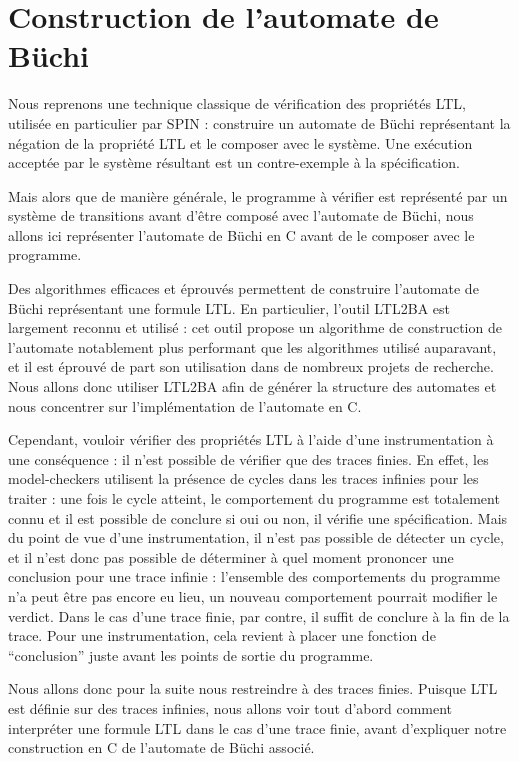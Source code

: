 \section{Construction de l'automate de Büchi}

Nous reprenons une technique classique de vérification des propriétés \ac{LTL},
utilisée en particulier par SPIN\cite{SPIN} : construire un automate de Büchi
représentant la négation de la propriété \ac{LTL} et le composer avec le
système. Une exécution acceptée par le système résultant est un contre-exemple à
la spécification.

Mais alors que de manière générale, le programme à vérifier est représenté par
un système de transitions avant d'être composé avec l'automate de Büchi, nous
allons ici représenter l'automate de Büchi en C avant de le composer avec le
programme.

Des algorithmes efficaces et éprouvés permettent de construire l'automate de
Büchi représentant une formule \ac{LTL}. En particulier, l'outil
LTL2BA\cite{ltl2ba} est largement reconnu et utilisé : cet outil propose un
algorithme de construction de l'automate notablement plus performant que les
algorithmes utilisé auparavant, et il est éprouvé de part son utilisation dans
de nombreux projets de recherche.
Nous allons donc utiliser LTL2BA afin de générer la structure des automates et
nous concentrer sur l'implémentation de l'automate en C.

Cependant, vouloir vérifier des propriétés \ac{LTL} à l'aide d'une
instrumentation à une conséquence : il n'est possible de vérifier que des traces
finies. En effet, les model-checkers utilisent la présence de cycles dans les
traces infinies pour les traiter : une fois le cycle atteint, le comportement du
programme est totalement connu et il est possible de conclure si oui ou non, il
vérifie une spécification. Mais du point de vue d'une instrumentation, il n'est
pas possible de détecter un cycle, et il n'est donc pas possible de déterminer à
quel moment prononcer une conclusion pour une trace infinie : l'ensemble des
comportements du programme n'a peut être pas encore eu lieu, un nouveau
comportement pourrait modifier le verdict. Dans le cas d'une trace finie, par
contre, il suffit de conclure à la fin de la trace. Pour une instrumentation,
cela revient à placer une fonction de ``conclusion'' juste avant les points de
sortie du programme.

Nous allons donc pour la suite nous restreindre à des traces finies. Puisque
\ac{LTL} est définie sur des traces infinies, nous allons voir tout d'abord
comment interpréter une formule \ac{LTL} dans le cas d'une trace finie, avant
d'expliquer notre construction en C de l'automate de Büchi associé.

